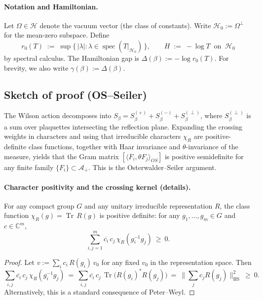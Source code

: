 \documentclass[11pt]{amsart}
\begin{document}
\paragraph{Notation and Hamiltonian.}
Let $\Omega\in\mathcal H$ denote the vacuum vector (the class of constants). Write $\mathcal H_0:=\Omega^{\perp}$ for the mean-zero subspace. Define
\[
  r_0(T)\;:=\; \sup\{\,|\lambda| : \lambda\in\operatorname{spec}(T|_{\mathcal H_0})\,\},\qquad
  H\;:=\;-\log T\ \text{ on }\ \mathcal H_0
\]
by spectral calculus. The Hamiltonian gap is $\Delta(\beta):=-\log r_0(T)$.
For brevity, we also write $\gamma(\beta):=\Delta(\beta)$.

\subsection*{Sketch of proof (OS--Seiler)}
The Wilson action decomposes into $S_\beta=S_\beta^{(+)}+S_\beta^{(-)}+S_\beta^{(\perp)}$, where $S_\beta^{(\perp)}$ is a sum over plaquettes intersecting the reflection plane. Expanding the crossing weights in characters and using that irreducible characters $\chi_R$ are positive-definite class functions, together with Haar invariance and $\theta$-invariance of the measure, yields that the Gram matrix $[\langle F_i,\theta F_j\rangle_{OS}]$ is positive semidefinite for any finite family $\{F_i\}\subset \mathcal A_+$. This is the Osterwalder--Seiler argument.

\paragraph{Character positivity and the crossing kernel (details).}
\begin{lemma}\label{lem:char-pd}
For any compact group $G$ and any unitary irreducible representation $R$, the class function $\chi_R(g)=\operatorname{Tr}\,R(g)$ is positive definite: for any $g_1,\dots,g_m\in G$ and $c\in\mathbb C^m$,
\[
  \sum_{i,j=1}^m \overline{c_i}\,c_j\,\chi_R(g_i^{-1} g_j)\ \ge\ 0.
\]
\end{lemma}
\begin{proof}
Let $v:=\sum_i c_i\,R(g_i)\,v_0$ for any fixed $v_0$ in the representation space. Then
\[
  \sum_{i,j}\overline{c_i}\,c_j\,\chi_R(g_i^{-1} g_j)\ =\ \sum_{i,j}\overline{c_i}\,c_j\,\operatorname{Tr}\big(R(g_i)^{*}R(g_j)\big)\ =\ \|\sum_j c_j R(g_j)\|_{\mathrm{HS}}^2\ \ge\ 0.
\]
Alternatively, this is a standard consequence of Peter–Weyl.
\end{proof}
\end{document}
